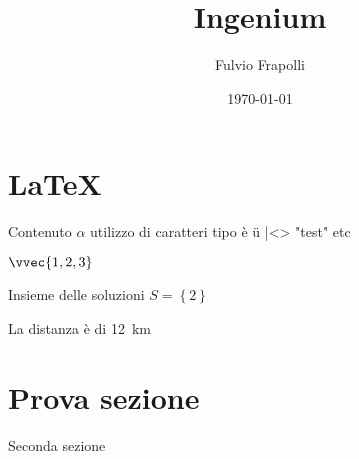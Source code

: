 \documentclass[]{article}
\title{Ingenium}
\author{Fulvio Frapolli}
\date{\today}
\begin{document}
\maketitle

\tableofcontents
\newpage



\section{\LaTeX}

Contenuto $\alpha$ utilizzo di caratteri tipo è ü |<> "test"
 etc

 $\vvec{1,2,3}$

 Insieme delle soluzioni $S=\left\lbrace 2 \right\rbrace$

 La distanza è di \qty{12}{\km}    

\section{Prova sezione}

Seconda sezione
\end{document}
